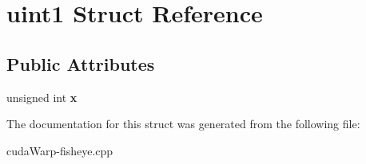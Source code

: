 \hypertarget{structuint1}{}\section{uint1 Struct Reference}
\label{structuint1}
\subsection*{Public Attributes}
\begin{DoxyCompactItemize}
\item 
unsigned int {\bfseries x}\hypertarget{structuint1_ac6324c49ac288c10703ab0682ec56137}{}\label{structuint1_ac6324c49ac288c10703ab0682ec56137}

\end{DoxyCompactItemize}


The documentation for this struct was generated from the following file\+:\begin{DoxyCompactItemize}
\item 
cuda\+Warp-\/fisheye.\+cpp\end{DoxyCompactItemize}
